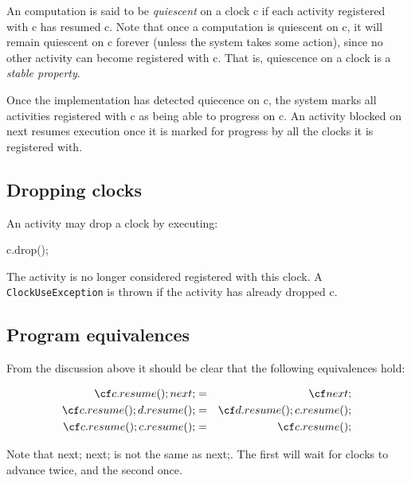 An \Xten{} computation is said to be {\em quiescent} on a clock {\cf
c} if each activity registered with {\cf c} has resumed {\cf c}.
Note that once a computation is quiescent on {\cf c}, it will remain
quiescent on {\cf c} forever (unless the system takes some action),
since no other activity can become registered with {\cf c}.  That is,
quiescence on a clock is a {\em stable property}.

Once the implementation has detected quiecence on {\cf c}, the system
marks all activities registered with {\cf c} as being able to progress
on {\cf c}. An activity blocked on {\cf next} resumes execution once
it is marked for progress by all the clocks it is registered with.

\subsection{Dropping clocks}\label{sec:clock:drop}
An activity may drop a clock by executing:
\begin{x10}
c.drop();
\end{x10}

\noindent{} The activity is no longer considered registered with this
clock.  A {\tt ClockUseException} is thrown if the activity has
already dropped {\cf c}.


\notinfouro{}

\subsection{Program equivalences}
From the discussion above it should be clear that the following
equivalences hold:

\begin{eqnarray}
 {\cf c.resume(); next;}       &=& {\cf next;}\\
 {\cf c.resume(); d.resume();} &=& {\cf d.resume(); c.resume();}\\
 {\cf c.resume(); c.resume();} &=&  {\cf c.resume();}
\end{eqnarray}

Note that {\cf next; next;} is not the same as {\cf next;}. The
first will wait for clocks to advance twice, and the second
once.  

\cbend
\notinfouro{}
\notinfouro{}
\notinfouro{}

